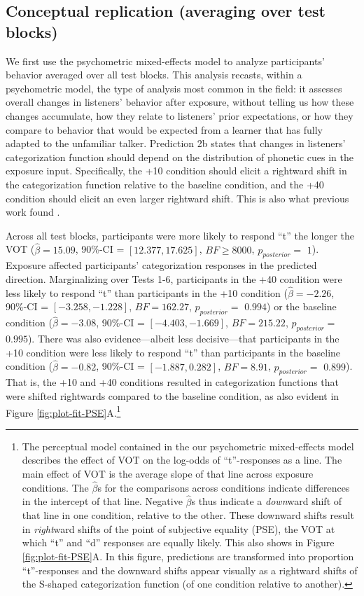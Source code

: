 \documentclass[
  11pt,
  man,mask,floatsintext]{apa6}
\begin{document}
\subsection{Conceptual replication (averaging over test blocks)}\label{conceptual-replication-averaging-over-test-blocks}

We first use the psychometric mixed-effects model to analyze participants' behavior averaged over all test blocks. This analysis recasts, within a psychometric model, the type of analysis most common in the field: it assesses overall changes in listeners' behavior after exposure, without telling us how these changes accumulate, how they relate to listeners' prior expectations, or how they compare to behavior that would be expected from a learner that has fully adapted to the unfamiliar talker. Prediction 2b states that changes in listeners' categorization function should depend on the distribution of phonetic cues in the exposure input. Specifically, the +10 condition should elicit a rightward shift in the categorization function relative to the baseline condition, and the +40 condition should elicit an even larger rightward shift. This is also what previous work found \autocite{kleinschmidt-jaeger2016}.

Across all test blocks, participants were more likely to respond ``t'' the longer the VOT (\(\hat{\beta} = 15.09\), 90\%-CI = \([12.377, 17.625]\), \(BF \geq 8000\), \(p_{posterior} =\) \(1\)). Exposure affected participants' categorization responses in the predicted direction. Marginalizing over Tests 1-6, participants in the +40 condition were less likely to respond ``t'' than participants in the +10 condition (\(\hat{\beta} = -2.26\), 90\%-CI = \([-3.258, -1.228]\), \(BF = 162.27\), \(p_{posterior} =\) \(0.994\)) or the baseline condition (\(\hat{\beta} = -3.08\), 90\%-CI = \([-4.403, -1.669]\), \(BF = 215.22\), \(p_{posterior} =\) \(0.995\)). There was also evidence---albeit less decisive---that participants in the +10 condition were less likely to respond ``t'' than participants in the baseline condition (\(\hat{\beta} = -0.82\), 90\%-CI = \([-1.887, 0.282]\), \(BF = 8.91\), \(p_{posterior} =\) \(0.899\)). That is, the +10 and +40 conditions resulted in categorization functions that were shifted rightwards compared to the baseline condition, as also evident in Figure \ref{fig:plot-fit-PSE}A.\footnote{The perceptual model contained in the our psychometric mixed-effects model describes the effect of VOT on the log-odds of ``t''-responses as a line. The main effect of VOT is the average slope of that line across exposure conditions. The \(\hat{\beta}\)s for the comparisons across conditions indicate differences in the intercept of that line. Negative \(\hat{\beta}\)s thus indicate a \emph{down}ward shift of that line in one condition, relative to the other. These downward shifts result in \emph{right}ward shifts of the point of subjective equality (PSE), the VOT at which ``t'' and ``d'' responses are equally likely. This also shows in Figure \ref{fig:plot-fit-PSE}A. In this figure, predictions are transformed into proportion ``t''-responses and the downward shifts appear visually as a rightward shifts of the S-shaped categorization function (of one condition relative to another).}
\end{document}
